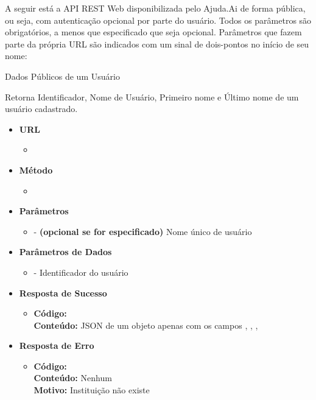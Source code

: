 A seguir está a API REST Web disponibilizada pelo Ajuda.Ai de forma pública, ou seja, com autenticação opcional por parte do usuário. Todos os parâmetros são obrigatórios, a menos que especificado que seja opcional. Parâmetros que fazem parte da própria URL são indicados com um sinal de dois-pontos no início de seu nome:

\begin{caixa}{Dados Públicos de um Usuário}{}

Retorna Identificador, Nome de Usuário, Primeiro nome e Último nome de um usuário cadastrado.

\begin{itemize}
\item \textbf{URL}
	\begin{itemize}
		\item {}
	\end{itemize}

\item \textbf{Método}
	\begin{itemize}
		\item {}
	\end{itemize}

\item \textbf{Parâmetros}
	\begin{itemize}
		\item {} - \textbf{(opcional se  for especificado)} Nome único de usuário
	\end{itemize}

\item \textbf{Parâmetros de Dados}
	\begin{itemize}
		\item {} - Identificador do usuário
	\end{itemize}

\item \textbf{Resposta de Sucesso}
	\begin{itemize}
		\item \textbf{Código:}  \\ \textbf{Conteúdo:} JSON de um objeto  apenas com os campos , , , 
	\end{itemize}

\item \textbf{Resposta de Erro}
	\begin{itemize}
		\item \textbf{Código:}  \\ \textbf{Conteúdo:} Nenhum \\ \textbf{Motivo:} Instituição não existe
	\end{itemize}

\end{itemize}
\end{caixa}

